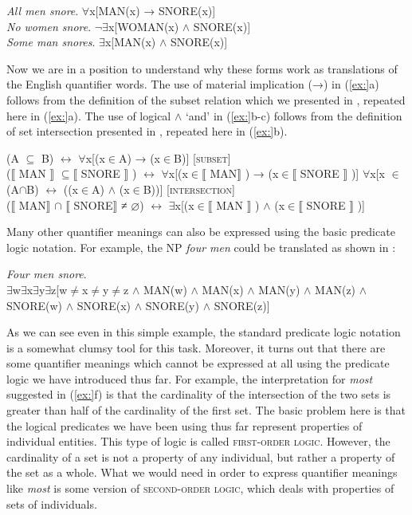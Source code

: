 \ea
\ea \textit{All men snore}.  ${\forall}$x[MAN(x) → SNORE(x)]\\
\ex \textit{No women snore}.  ${\lnot}$${\exists}$x[WOMAN(x) $\wedge$ SNORE(x)]\\
\ex \textit{Some man snores}.  ${\exists}$x[MAN(x) $\wedge$ SNORE(x)]
                       \z
\z


Now we are in a position to understand why these forms work as translations of the English quantifier words. The use of material implication (→) in (\ref{ex:}a) follows from the definition of the subset relation which we presented in , repeated here in (\ref{ex:}a). The use of logical $\wedge$ ‘and’ in (\ref{ex:}b-c) follows from the definition of set intersection presented in , repeated here in (\ref{ex:}b).


\ea
\ea  (A ${\subseteq}$ B)  $\leftrightarrow $  ${\forall}$x[(x${\in}$A) → (x${\in}$B)]  [\textsc{subset}]\\
  ($\llbracket$ MAN $\rrbracket$  ${\subseteq} \llbracket$ SNORE $\rrbracket$ )  $\leftrightarrow $  ${\forall}$x[(x${\in}\llbracket$ MAN$\rrbracket$ ) → (x${\in}\llbracket$ SNORE $\rrbracket$ )]
\ex  ${\forall}$x[x ${\in}$ (A${\cap}$B)  $\leftrightarrow $  ((x${\in}$A) $\wedge$ (x${\in}$B))]  [\textsc{intersection}]\\
  ($\llbracket$ MAN$\rrbracket$ ${\cap}$ $\llbracket$ SNORE$\rrbracket$  ≠ ⌀) $\leftrightarrow $  ${\exists}$x[(x${\in}\llbracket$ MAN $\rrbracket$ ) $\wedge$ (x${\in} \llbracket$  SNORE $\rrbracket$ )]
\z \z


Many other quantifier meanings can also be expressed using the basic predicate logic notation. For example, the NP \textit{four men} could be translated as shown in :


\ea
\textit{Four men snore}.\\
${\exists}$w${\exists}$x${\exists}$y${\exists}$z[w${\neq}$x${\neq}$y${\neq}$z $\wedge$ MAN(w) $\wedge$ MAN(x) $\wedge$ MAN(y) $\wedge$ MAN(z) $\wedge$ SNORE(w) $\wedge$ SNORE(x) $\wedge$ SNORE(y) $\wedge$ SNORE(z)]
\z


As we can see even in this simple example, the standard predicate logic notation is a somewhat clumsy tool for this task. Moreover, it turns out that there are some quantifier meanings which cannot be expressed at all using the predicate logic we have introduced thus far. For example, the interpretation for \textit{most} suggested in (\ref{ex:}f) is that the cardinality of the intersection of the two sets is greater than half of the cardinality of the first set. The basic problem here is that the logical predicates we have been using thus far represent properties of individual entities. This type of logic is called \textsc{first-order logic}. However, the cardinality of a set is not a property of any individual, but rather a property of the set as a whole. What we would need in order to express quantifier meanings like \textit{most} is some version of \textsc{second-order logic}, which deals with properties of sets of individuals.



